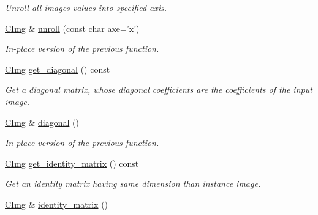 \begin{DoxyCompactItemize}
\begin{DoxyCompactList}\small\item\em Unroll all images values into specified axis. \end{DoxyCompactList}\item 
\hypertarget{structcimg__library_1_1_c_img_a4fe05a8bfe2fd0404456c21b6e43f01c}{\hyperlink{structcimg__library_1_1_c_img}{C\-Img} \& \hyperlink{structcimg__library_1_1_c_img_a4fe05a8bfe2fd0404456c21b6e43f01c}{unroll} (const char axe='x')}\label{structcimg__library_1_1_c_img_a4fe05a8bfe2fd0404456c21b6e43f01c}

\begin{DoxyCompactList}\small\item\em In-\/place version of the previous function. \end{DoxyCompactList}\item 
\hypertarget{structcimg__library_1_1_c_img_a8437cf30de955154744546a1d8500837}{\hyperlink{structcimg__library_1_1_c_img}{C\-Img} \hyperlink{structcimg__library_1_1_c_img_a8437cf30de955154744546a1d8500837}{get\-\_\-diagonal} () const }\label{structcimg__library_1_1_c_img_a8437cf30de955154744546a1d8500837}

\begin{DoxyCompactList}\small\item\em Get a diagonal matrix, whose diagonal coefficients are the coefficients of the input image. \end{DoxyCompactList}\item 
\hypertarget{structcimg__library_1_1_c_img_a40b6808b8cefada797a46a1309a25664}{\hyperlink{structcimg__library_1_1_c_img}{C\-Img} \& \hyperlink{structcimg__library_1_1_c_img_a40b6808b8cefada797a46a1309a25664}{diagonal} ()}\label{structcimg__library_1_1_c_img_a40b6808b8cefada797a46a1309a25664}

\begin{DoxyCompactList}\small\item\em In-\/place version of the previous function. \end{DoxyCompactList}\item 
\hypertarget{structcimg__library_1_1_c_img_a3f202a057d1bf445f01a7ef60a9e8092}{\hyperlink{structcimg__library_1_1_c_img}{C\-Img} \hyperlink{structcimg__library_1_1_c_img_a3f202a057d1bf445f01a7ef60a9e8092}{get\-\_\-identity\-\_\-matrix} () const }\label{structcimg__library_1_1_c_img_a3f202a057d1bf445f01a7ef60a9e8092}

\begin{DoxyCompactList}\small\item\em Get an identity matrix having same dimension than instance image. \end{DoxyCompactList}\item 
\hypertarget{structcimg__library_1_1_c_img_aae3985708b33a3122eeb22cd7c7900cf}{\hyperlink{structcimg__library_1_1_c_img}{C\-Img} \& \hyperlink{structcimg__library_1_1_c_img_aae3985708b33a3122eeb22cd7c7900cf}{identity\-\_\-matrix} ()}\label{structcimg__library_1_1_c_img_aae3985708b33a3122eeb22cd7c7900cf}


\end{DoxyCompactItemize}
